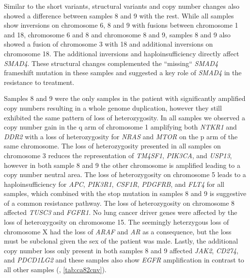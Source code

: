 Similar to the short variants, structural variants and copy number changes also showed a difference between samples 8 and 9 with the rest. While all samples show inversions on chromosome 6, 8 and 9 with fusions between chromosome 1 and 18, chromosome 6 and 8 and chromosome 8 and 9, samples 8 and 9 also showed a fusion of chromosome 3 with 18 and additional inversions on chromosome 18. The additional inversions and haploinsufficiency directly affect \textit{SMAD4}. These structural changes complemented the ``missing`` \textit{SMAD4} frameshift mutation in these samples and suggested a key role of \textit{SMAD4} in the resistance to treatment.

Samples 8 and 9 were the only samples in the patient with significantly amplified copy numbers resulting in a whole genome duplication, however they still exhibited the same pattern of loss of heterozygosity. In all samples we observed a copy number gain in the q arm of chromosome 1 amplifying both \textit{NTKR1} and \textit{DDR2} with a loss of heterozygosity for \textit{NRAS} and \textit{MTOR} on the p arm of the same chromosome. The loss of heterozygosity presented in all samples on chromosome 3 reduces the representation of \textit{TM4SF1}, \textit{PIK3CA}, and \textit{USP13}, however in both sample 8 and 9 the other chromosome is amplified leading to a copy number neutral area. The loss of heterozygosity on chromosome 5 leads to a haploinsufficiency for \textit{APC}, \textit{PIK3R1}, \textit{CSF1R}, \textit{PDGFRB}, and \textit{FLT4} for all samples, which combined with the stop mutation in samples 8 and 9 is suggestive of a common resistance pathway. The loss of heterozygosity on chromosome 8 affected \textit{TUSC3} and \textit{FGFR1}. No lung cancer driver genes were affected by the loss of heterozygosity on chromosome 15. The seemingly heterzygous loss of chromosome X had the loss of \textit{ARAF} and \textit{AR} as a consequence, but the loss must be subclonal given the sex of the patient was male. Lastly, the additional copy number loss only present in both samples 8 and 9 affected \textit{JAK2}, \textit{CD274}, and \textit{PDCD1LG2} and these samples also show \textit{EGFR} amplification in contrast to all other samples (,  \autoref{tab:ca82cnv}). 


